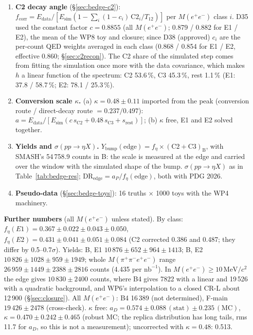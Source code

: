 \documentclass[11pt,a4paper]{article}
\newcommand{\Mfour}{\ensuremath{M(\pi^{+}\pi^{-}e^{+}e^{-})}\xspace}
\newcommand{\Mee}{\ensuremath{M(e^{+}e^{-})}\xspace}
\newcommand{\nbinv}{\ensuremath{\mathrm{nb}^{-1}}\xspace}
\newcommand{\MeVcc}{\ensuremath{\mathrm{MeV}/c^{2}}\xspace}
\newcommand{\aP}{\ensuremath{a_P}\xspace}
\newcommand{\Ybump}{\ensuremath{Y_{\mathrm{bump}}}\xspace}
\newcommand{\sigeta}{\ensuremath{\sigma(pp\to\eta X)}\xspace}
\begin{document}
\begin{enumerate}
      all readings (the package names its families E1--E10, as in Fig.~\ref{fig:bedge-syst}a, which shows E1--E9; they are not the \Mee classes
      E1, E2). The Part~III
      rules of WP7 are used: a shift counts as $\delta^2=\max(0,\Delta^2-|\sigma^2_{\mathrm{stat},v}-\sigma^2_{\mathrm{stat},0}|-\mathrm{MC}(\Delta)^2)$;
      a pair of opposite variants counts $(|\delta_+|+|\delta_-|)/2$; a family is its largest entry; families add in quadrature; variants that
      the data reject are listed, not counted (rule R1).
\item \textbf{C2 decay angle} (\S\ref{sec:bedge-c2}): $f_{\mathrm{corr}}=E_{\mathrm{data}}/[E_{\mathrm{sim}}(1-\sum_i(1-c_i)\,\mathrm{C2}_i/T_{12})]$ per \Mee
      class $i$. D35 used the constant factor $c=0.8855$ (all \Mee; 0.879 / 0.882 for E1 / E2), the mean of the WP8 toy and closure; since D38
      (approved) $c_i$ are the per-count QED weights averaged in each class (0.868 / 0.854 for E1 / E2, effective 0.860; \S\ref{sec:c2recon}). The C2 share of the
      simulated step comes from fitting the simulation once more with the data covariance, which makes $h$ a linear function of the spectrum:
      C2 53.6\,\%, C3 45.3\,\%, rest 1.1\,\% (E1: 37.8 / 58.7\,\%; E2: 78.1 / 25.3\,\%).
\item \textbf{Conversion scale $\kappa$.} (a) $\kappa=0.48\pm0.11$ imported from the peak (conversion route / direct-decay route $=0.237/0.497$):
      $a=E_{\mathrm{data}}/[E_{\mathrm{sim}}(c\,s_{\mathrm{C2}}+0.48\,s_{\mathrm{C3}}+s_{\mathrm{rest}})]$; (b) $\kappa$ free, E1 and E2 solved together.
\item \textbf{Yields and \sigeta.} $\Ybump(\mathrm{edge})=f_\eta\times(\mathrm{C2}+\mathrm{C3})_{\mathrm{B}}$, with SMASH's 54\,758.9 counts in B: the scale
      is measured at the edge and carried over the window with the simulated shape of the bump. \sigeta as in Table~\ref{tab:bedge-res};
      $\mathrm{DR}_{\mathrm{edge}}=\aP/f_\eta(\mathrm{edge})$, both with PDG 2026.
\item \textbf{Pseudo-data} (\S\ref{sec:bedge-toys}): 16 truths $\times$ 1000 toys with the WP4 machinery.
\end{enumerate}

\textbf{Further numbers} (all \Mee unless stated). By class: $f_\eta(E1)=0.367\pm0.022\pm0.043\pm0.050$, $f_\eta(E2)=0.431\pm0.041\pm0.051\pm0.084$ (C2
corrected 0.386 and 0.487; they differ by 0.5--0.7$\sigma$). Yields: B, E1 $10\,876\pm652\pm964\pm1413$; B, E2 $10\,826\pm1028\pm959\pm1949$; whole
\Mfour range $26\,959\pm1449\pm2388\pm2816$ counts (4.435 per \nbinv). In \Mee$\ge10$\,\MeVcc the edge gives $10\,830\pm2400$ counts, where B4 gives
7822 with a linear and 19\,526 with a quadratic background, and WP6's interpolation to a closed CR-L about 12\,900 (\S\ref{sec:closure}). All
\Mee: B4 16\,389 (not determined), F-main $19\,426\pm2478$ (cross-check). $\kappa$ free: $a_D=0.574\pm0.088\,(\mathrm{stat})\pm0.235\,(\mathrm{MC})$,
$\kappa=0.470\pm0.242\pm0.465$ (robust MC; the replica distribution has long tails, rms 11.7 for $a_D$, so this is not a measurement);
uncorrected with $\kappa=0.48$: 0.513.
\end{document}
